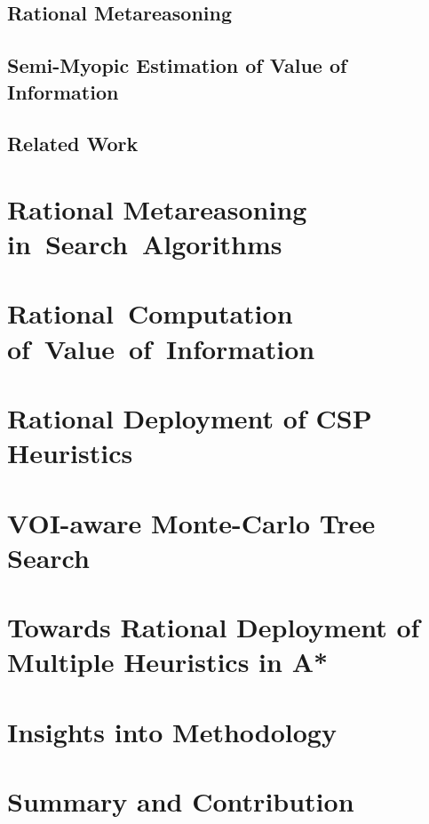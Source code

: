 \documentclass[oneside,12pt]{report}
\begin{document}
\section{Rational Metareasoning}
\label{sec:ratimeta}


\section{Semi-Myopic Estimation of Value of Information}
\label{sec:blinkered}


\section{Related Work}
\label{sec:related}


\chapter{Rational Metareasoning in~Search~Algorithms}
\label{ch:ramesrch}


\chapter{Rational~Computation of~Value~of~Information}
\label{ch:raticomp}


\chapter{Rational Deployment of CSP Heuristics}
\label{ch:cs-csp}


\chapter{VOI-aware Monte-Carlo Tree Search}
\label{ch:cs-mcts}


\chapter{Towards Rational Deployment of Multiple Heuristics in A*}
\label{ch:cs-rla}


\chapter{Insights into Methodology}
\label{ch:insights}


\chapter {Summary and Contribution}
\label{ch:summary}




\end{document}
